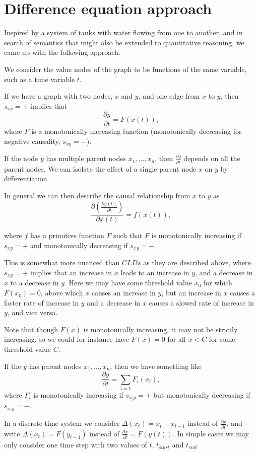 \documentclass[a4paper,11pt]{article}
\begin{document}
\section{Difference equation approach}

Inspired by a system of tanks with water flowing from one to another,
and in search of semantics that might also be extended to quantitative
reasoning, we came up with the following approach.

We consider the value nodes of the graph to be functions of the same
variable, such as a time variable $t$.

If we have a graph with two nodes, $x$ and $y$, and one edge from $x$
to $y$, then $s_{xy}=+$ implies that
\[\frac{\partial y}{\partial t} = F(x(t)),\]
where $F$ is a monotonically increasing function (monotonically decreasing for negative
causality, $s_{xy}=-$).

If the node $y$ has multiple parent nodes $x_1,\ldots,x_n$, then
$\frac{\partial y}{\partial t}$ depends on all the parent nodes. We can
isolate the effect of a single parent node $x$ on $y$ by differentiation.

In general we can then describe the causal relationship from $x$ to
$y$ as
\[\frac{\partial\left( \frac{\partial y(t)}{\partial t} \right)}{\partial x(t)} =
  f(x(t)),\]

where $f$ has a primitive function $F$ such that $F$ is monotonically
increasing if $s_{xy}=+$ and monotonically decreasing if $s_{xy}= -$.

This is somewhat more nuanced than $CLDs$ as they are described above,
where $s_{xy}=+$ implies that an increase in $x$ leads to an increase
in $y$, and a decrease in $x$ to a decrease in $y$.
%
Here we may have some threshold value $x_0$ for which $F(x_0) = 0$,
above which $x$ causes an increase in $y$, but an increase in $x$
causes a faster rate of increase in $y$ and a decrease in $x$ causes a
slowed rate of increase in $y$, and vice versa.

Note that though $F(x)$ is monotonically increasing, it may not be strictly
increasing, so we could for instance have $F(x) = 0$ for all $x < C$
for some threshold value $C$.

If the $y$ has parent nodes $x_1,\ldots,x_n$, then we have something
like
\[\frac{\partial y}{\partial t} = \sum_{i=1}F_i(x_i),\]
where $F_i$ is monotonically increasing if $s_{x_iy}=+$ but monotonically
decreasing if $s_{x_iy}=-$.

In a discrete time system we consider $\Delta(x_t) = x_t - x_{t-1}$
instead of $\frac{\partial x}{\partial t}$, and write
$\Delta(x_t) = F(y_{t-1})$ instead of
$\frac{\partial x}{\partial t} = F(y(t))$.
%
In simple cases we may only consider one time step with two values of
$t$, $t_{start}$ and $t_{end}$.
\end{document}
